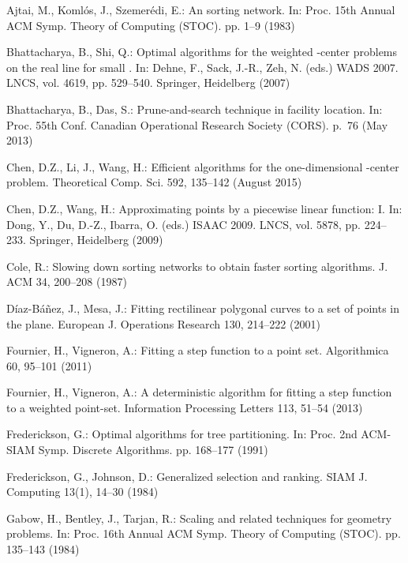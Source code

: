 \documentclass[preprint,10pt]{elsarticle}
\begin{document}
\begin{thebibliography}{10}
\providecommand{\url}[1]{\texttt{#1}}
\providecommand{\urlprefix}{URL }

Ajtai, M., Koml\'{o}s, J., Szemer\'{e}di, E.: An  sorting
  network. In: Proc. 15th Annual ACM Symp. Theory of Computing (STOC). pp. 1--9
  (1983)

Bhattacharya, B., Shi, Q.: Optimal algorithms for the weighted -center
  problems on the real line for small . In: Dehne, F., Sack, J.-R., Zeh, N. (eds.)
  WADS 2007. LNCS, vol. 4619, pp. 529--540. Springer, Heidelberg (2007)

Bhattacharya, B., Das, S.: Prune-and-search technique in facility location. In:
  Proc. 55th Conf. Canadian Operational Research Society (CORS). p.~76 (May
  2013)

Chen, D.Z., Li, J., Wang, H.: Efficient algorithms for the one-dimensional
  -center problem. Theoretical Comp. Sci.  592,  135--142 (August 2015)

Chen, D.Z., Wang, H.: Approximating points by a piecewise linear function: I.
In: Dong, Y., Du, D.-Z., Ibarra, O. (eds.) ISAAC 2009. LNCS, vol. 5878,
pp. 224--233. Springer, Heidelberg (2009)

Cole, R.: Slowing down sorting networks to obtain faster sorting algorithms. J.
  ACM  34,  200--208 (1987)

{D\'{i}az-B\'{a}\~{n}ez}, J., Mesa, J.: Fitting rectilinear polygonal curves to
  a set of points in the plane. European J. Operations Research  130,  214--222
  (2001)

Fournier, H., Vigneron, A.: Fitting a step function to a point set.
  Algorithmica  60,  95--101 (2011)

Fournier, H., Vigneron, A.: A deterministic algorithm for fitting a step
  function to a weighted point-set. Information Processing Letters  113,
  51--54 (2013)

Frederickson, G.: Optimal algorithms for tree partitioning. In: Proc. 2nd
  ACM-SIAM Symp. Discrete Algorithms. pp. 168--177 (1991)

Frederickson, G., Johnson, D.: Generalized selection and ranking. SIAM J.
  Computing  13(1),  14--30 (1984)

Gabow, H., Bentley, J., Tarjan, R.: Scaling and related techniques for geometry
  problems. In: Proc. 16th Annual ACM Symp. Theory of Computing (STOC). pp.
  135--143 (1984)


\end{thebibliography}
\end{document}
